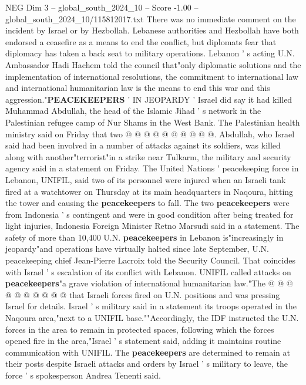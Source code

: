 \begin{textsample}{NEG Dim 3 – global\_south\_2024\_10 – Score -1.00 – global\_south\_2024\_10/115812017.txt}
There was no immediate comment on the incident by Israel or by Hezbollah.
Lebanese authorities and Hezbollah have both endorsed a ceasefire as a means to end the conflict, but diplomats fear that diplomacy has taken a back seat to military operations.
Lebanon ' s acting U.N.
Ambassador Hadi Hachem told the council that"only diplomatic solutions and the implementation of international resolutions, the commitment to international law and international humanitarian law is the means to end this war and this aggression."\textbf{PEACEKEEPERS} ' IN JEOPARDY ' Israel did say it had killed Muhammad Abdullah, the head of the Islamic Jihad ' s network in the Palestinian refugee camp of Nur Shams in the West Bank.
The Palestinian health ministry said on Friday that two @ @ @ @ @ @ @ @ @ @.
Abdullah, who Israel said had been involved in a number of attacks against its soldiers, was killed along with another"terrorist"in a strike near Tulkarm, the military and security agency said in a statement on Friday.
The United Nations ' peacekeeping force in Lebanon, UNIFIL, said two of its personnel were injured when an Israeli tank fired at a watchtower on Thursday at its main headquarters in Naqoura, hitting the tower and causing the \textbf{peacekeepers} to fall.
The two \textbf{peacekeepers} were from Indonesia ' s contingent and were in good condition after being treated for light injuries, Indonesia Foreign Minister Retno Marsudi said in a statement.
The safety of more than 10,400 U.N. \textbf{peacekeepers} in Lebanon is"increasingly in jeopardy"and operations have virtually halted since late September, U.N. peacekeeping chief Jean-Pierre Lacroix told the Security Council.
That coincides with Israel ' s escalation of its conflict with Lebanon.
UNIFIL called attacks on \textbf{peacekeepers}"a grave violation of international humanitarian law."The @ @ @ @ @ @ @ @ @ @ that Israeli forces fired on U.N. positions and was pressing Israel for details.
Israel ' s military said in a statement its troops operated in the Naqoura area,"next to a UNIFIL base.""Accordingly, the IDF instructed the U.N. forces in the area to remain in protected spaces, following which the forces opened fire in the area,"Israel ' s statement said, adding it maintains routine communication with UNIFIL.
The \textbf{peacekeepers} are determined to remain at their posts despite Israeli attacks and orders by Israel ' s military to leave, the force ' s spokesperson Andrea Tenenti said.

\end{textsample}
